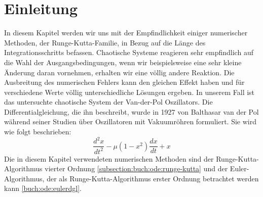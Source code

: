%
%
%
\section{Einleitung\label{vanderpol:section:einleitung}}
In diesem Kapitel werden wir uns mit der Empfindlichkeit einiger numerischer Methoden, der Runge-Kutta-Familie, in Bezug auf die Länge des Integrationsschritts befassen.
Chaotische Systeme reagieren sehr empfindlich auf die Wahl der Ausgangsbedingungen, wenn wir beispielsweise eine sehr kleine Änderung daran vornehmen, erhalten wir eine völlig andere Reaktion.
Die Ausbreitung des numerischen Fehlers kann den gleichen Effekt haben und für verschiedene Werte völlig unterschiedliche Lösungen ergeben.
In unserem Fall ist das untersuchte chaotische System der Van-der-Pol Oszillators.
Die Differentialgleichung, die ihn beschreibt, wurde in 1927 von Balthasar van der Pol während seiner Studien über Oszillatoren mit Vakuumröhren formuliert.
Sie wird wie folgt beschrieben:
\begin{equation}
\frac{d^{2}x}{dt^{2}} - \mu (1 - x^{2}) \frac{dx}{dt} + x
\label{vanderpol:equations:vdp}
\end{equation}
Die in diesem Kapitel verwendeten numerischen Methoden sind der Runge-Kutta-Algorithmus vierter Ordnung \ref{subsection:buch:ode:runge-kutta} und der Euler-Algorithmus, der als Runge-Kutta-Algorithmus erster Ordnung betrachtet werden kann \ref{buch:ode:eulerdgl}.

